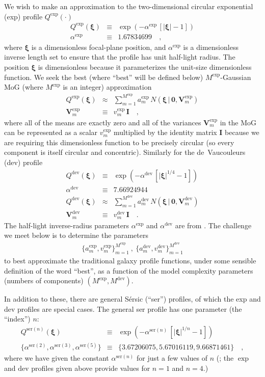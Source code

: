 \documentclass[12pt,pdftex,preprint]{aastex}
\newcommand{\tmatrix}[1]{\boldsymbol{#1}}
\newcommand{\tvector}[1]{\boldsymbol{#1}}
\newcommand{\spos}{\tvector{\xi}}
\newcommand{\var}{\tmatrix{V}}
\newcommand{\zero}{\tmatrix{0}}
\newcommand{\identity}{\tmatrix{I}}
\newcommand{\normal}{N}
\newcommand{\given}{\,|\,}
\newcommand{\dev}{\mathrm{dev}}
\newcommand{\ser}{\mathrm{ser}}
\begin{document}
We wish to make an approximation to the two-dimensional circular
exponential (exp) profile $Q^{\exp}(\cdot)$
\begin{eqnarray}\displaystyle
Q^{\exp}(\spos) &\equiv& \exp(-\alpha^{\exp}\,[|\spos| - 1])
\\
\alpha^{\exp} &\equiv& 1.67834699
\quad ,
\end{eqnarray}
where $\spos$ is a dimensionless focal-plane position, and
$\alpha^{\exp}$ is a dimensionless inverse length set to ensure that
the profile has unit half-light radius.  The position $\spos$ is
dimensionless because it parameterizes the unit-size dimensionless
function.  We seek the best (where ``best'' will be defined below)
$M^{\exp}$-Gaussian MoG (where $M^{\exp}$ is an integer) approximation
\begin{eqnarray}\displaystyle
Q^{\exp}(\spos) &\approx& \sum_{m=1}^{M^{\exp}} a^{\exp}_m\,\normal(\spos\given\zero,\var^{\exp}_m)
\\
\var^{\exp}_m &\equiv& v^{\exp}_m\,\identity
\quad ,
\end{eqnarray}
where all of the means are exactly zero and all of the variances
$\var^{\exp}_m$ in the MoG can be represented as a scalar
$v^{\exp}_m$ multiplied by the identity matrix $\identity$
because we are requiring this dimensionless function to be precisely
circular (so every component is itself circular and concentric).
Similarly for the de~Vaucouleurs (dev) profile
\begin{eqnarray}\displaystyle
Q^{\dev}(\spos) &\equiv& \exp(-\alpha^{\dev}\,[|\spos|^{1/4} - 1])
\\
\alpha^{\dev} &\equiv& 7.66924944
\\
Q^{\dev}(\spos) &\approx& \sum_{m=1}^{M^{\dev}} a^{\dev}_m\,\normal(\spos\given\zero,\var^{\dev}_m)
\\
\var^{\dev}_m &\equiv& v^{\dev}_m\,\identity
\quad .
\end{eqnarray}
The half-light inverse-radius parameters $\alpha^{\exp}$ and
$\alpha^{\dev}$ are from \citet{ciotti}.  The challenge we
meet below is to determine the parameters
\begin{eqnarray}
\{a^{\exp}_m,v^{\exp}_m\}_{m=1}^{M^{\exp}}~,~\{a^{\dev}_m,v^{\dev}_m\}_{m=1}^{M^{\dev}}
\end{eqnarray}
to best approximate the traditional galaxy profile functions, under
some sensible definition of the word ``best'', as a function of the
model complexity parameters (numbers of components) $(M^{\exp},
M^{\dev})$.

In addition to these, there are general S\'ersic (``ser'') profiles, of
which the exp and dev profiles are special cases.  The general ser
profile has one parameter (the ``index'') $n$:
\begin{eqnarray}\displaystyle
Q^{\ser(n)}(\spos) &\equiv& \exp(-\alpha^{\ser(n)}\,[|\spos|^{1/n} - 1])
\\
\{\alpha^{\ser(2)}, \alpha^{\ser(3)}, \alpha^{\ser(5)}\} &\equiv& \{3.67206075, 5.67016119, 9.66871461\}
\quad ,
\end{eqnarray}
where we have given the constant $\alpha^{\ser(n)}$ for just a few
values of $n$ (\citealt{ciotti}; the $\exp$ and $\dev$ profiles given
above provide values for $n=1$ and $n=4$.)
\end{document}
